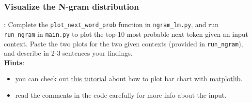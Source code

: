 \subsubsection{Visualize the N-gram distribution}
\todo{}: Complete the \texttt{plot\_next\_word\_prob} function in \texttt{ngram\_lm.py}, and run \texttt{run\_ngram} in \texttt{main.py} to plot the top-10 most probable next token given an input context. Paste the two plots for the two given contexts (provided in \texttt{run\_ngram}), and describe in 2-3 sentences your findings. \\
\textbf{Hints}:
\begin{itemize}
    \item you can check out \href{https://www.geeksforgeeks.org/bar-plot-in-matplotlib/}{this tutorial} about how to plot bar chart with \href{https://matplotlib.org/stable/api/_as_gen/matplotlib.pyplot.bar.html}{matplotlib}.
    \item read the comments in the code carefully for more info about the input.
\end{itemize}
\noindent {\color{red}{your plots and answer:}}\\

